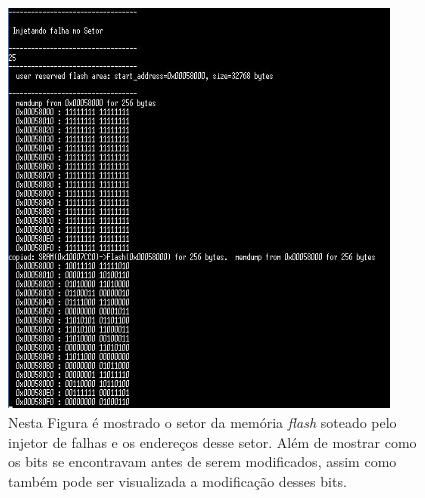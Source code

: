 \begin{figure}
	\centering
	\includegraphics[width=0.9\textwidth]{figuras/injecaoFlash.jpg}
	\caption[Injeção de Falhas na Memória \textit{Flash}]{Nesta Figura é mostrado o setor da memória \textit{flash} soteado pelo injetor de falhas e os endereços desse setor. Além de mostrar como os bits se encontravam antes de serem modificados, assim como também pode ser visualizada a modificação desses bits.}
	\label{Img:injecaoFlash}	
\end{figure}